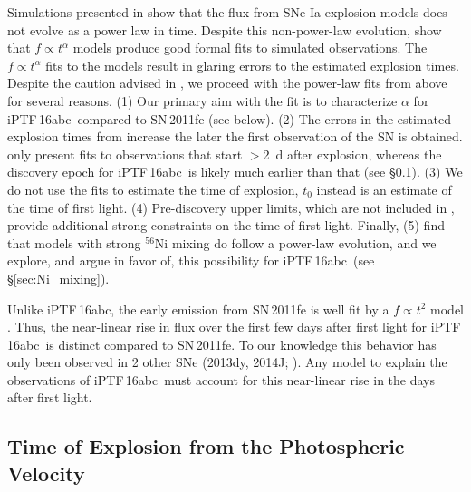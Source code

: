 \documentclass[twocolumn]{aastex61}
\newcommand{\abc}{iPTF\,16abc}
\begin{document}
Simulations presented in \citet{2017arXiv170603613N} show that the flux from SNe Ia explosion models does not evolve as a power law in time. Despite this non-power-law evolution, \citet{2017arXiv170603613N} show that $f \propto t^\alpha$ models produce good formal fits to simulated observations. The $f \propto t^\alpha$ fits to the \citeauthor{2017arXiv170603613N} models result in glaring errors to the estimated explosion times. Despite the caution advised in \citet{2017arXiv170603613N}, we proceed with the power-law fits from above for several reasons. (1) Our primary aim with the fit is to characterize $\alpha$ for \abc\ compared to SN\,2011fe (see below). (2) The errors in the estimated explosion times from \citeauthor{2017arXiv170603613N} increase the later the first observation of the SN is obtained. \citeauthor{2017arXiv170603613N} only present fits to observations that start $>$2~d after explosion, whereas the discovery epoch for \abc\ is likely much earlier than that (see \S\ref{sec:early_vel}). (3) We do not use the fits to estimate the time of explosion, $t_0$ instead is an estimate of the time of first light. (4) Pre-discovery upper limits, which are not included in \citeauthor{2017arXiv170603613N}, provide additional strong constraints on the time of first light. Finally, (5) \citet{2017arXiv170603613N} find that models with strong $^{56}$Ni mixing do follow a power-law evolution, and we explore, and argue in favor of, this possibility for \abc\ (see \S\ref{sec:Ni_mixing}).

Unlike \abc, the early emission from SN\,2011fe is well fit by a $f \propto t^2$ model \citep{2011Natur.480..344N}. Thus, the near-linear rise in flux over the first few days after first light for \abc\ is distinct compared to SN\,2011fe. To our knowledge this behavior has only been observed in 2 other SNe (2013dy, 2014J; \citealt{2013ApJ...778L..15Z,2014ApJ...783L..24Z,2015ApJ...799..106G}). Any model to explain the observations of \abc\ must account for this near-linear rise in the days after first light.  

\subsection{Time of Explosion from the Photospheric Velocity}
\label{sec:early_vel}
\end{document}
